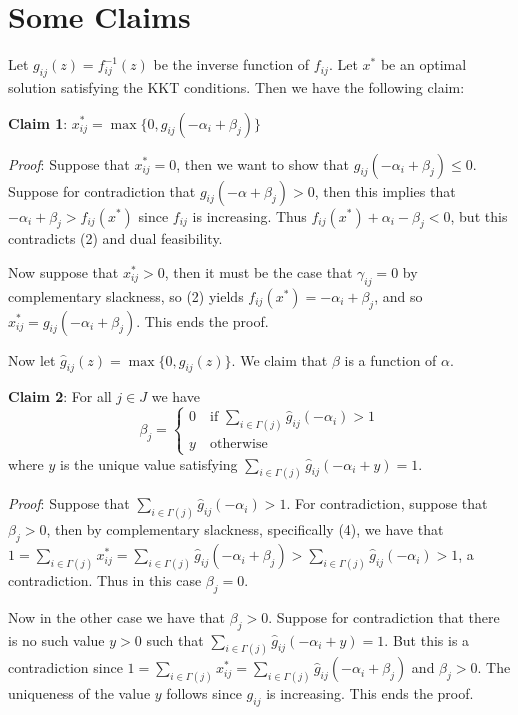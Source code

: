 \documentclass[11pt]{article}
\begin{document}
\section{Some Claims}

Let $g_{ij} (z) = f^{-1}_{ij}(z)$ be the inverse function of $f_{ij}$.  Let $x^*$ be an optimal solution satisfying the KKT conditions.  Then we have the following claim:

\textbf{Claim 1}: $x_{ij}^* = \max \{0, g_{ij}( - \alpha_i + \beta_j)\} $

\emph{Proof}: Suppose that $x_{ij}^* = 0$, then we want to show that $g_{ij}(-\alpha_i + \beta_j) \leq 0$.  Suppose for contradiction that $g_{ij}(-\alpha+ \beta_j) > 0$, then this implies that $-\alpha_i + \beta_j > f_{ij}(x^*)$ since $f_{ij}$ is increasing. Thus  $f_{ij}(x^*) + \alpha_i - \beta_j < 0$, but this contradicts (2) and dual feasibility.

Now suppose that $x_{ij}^* > 0$, then it must be the case that $\gamma_{ij} = 0$ by complementary slackness, so (2) yields $f_{ij}(x^*) = -\alpha_i + \beta_j$, and so $x_{ij}^* = g_{ij}(-\alpha_i + \beta_j)$.  This ends the proof.

Now let $\hat{g}_{ij}(z) = \max\{0,g_{ij}(z)\}$.  We claim that $\beta$ is a function of $\alpha$.

\textbf{Claim 2}: For all $j \in J$ we have
\begin{equation}
\beta_j = 
\begin{cases}
0 \quad \text{if } \sum_{i \in \Gamma(j)} \hat{g}_{ij} (- \alpha_i) > 1 \\
y \quad \text{otherwise}
\end{cases}
\end{equation}
where $y$ is the unique value satisfying $\sum_{i \in \Gamma(j)} \hat{g}_{ij} (-\alpha_i + y) = 1$.

\emph{Proof}: Suppose that $\sum_{i \in \Gamma(j)} \hat{g}_{ij} (- \alpha_i) > 1$.  For contradiction, suppose that $\beta_j > 0$, then by complementary slackness, specifically (4), we have that $1 = \sum_{i \in \Gamma(j)} x_{ij}^* = \sum_{i \in \Gamma(j)} \hat{g}_{ij}(-\alpha_i + \beta_j) > \sum_{i \in \Gamma(j)} \hat{g}_{ij}(-\alpha_i) > 1$, a contradiction.  Thus in this case $\beta_j = 0$.

Now in the other case we have that $\beta_j > 0$.  Suppose for contradiction that there is no such value $y > 0$ such that $\sum_{i \in \Gamma(j)} \hat{g}_{ij} (-\alpha_i + y) = 1$.  But this is a contradiction since $1 =  \sum_{i \in \Gamma(j)} x_{ij}^* = \sum_{i \in \Gamma(j)} \hat{g}_{ij} (-\alpha_i + \beta_j)$ and $\beta_j > 0$.  The uniqueness of the value $y$ follows since $g_{ij}$ is increasing.  This ends the proof.
\end{document}
